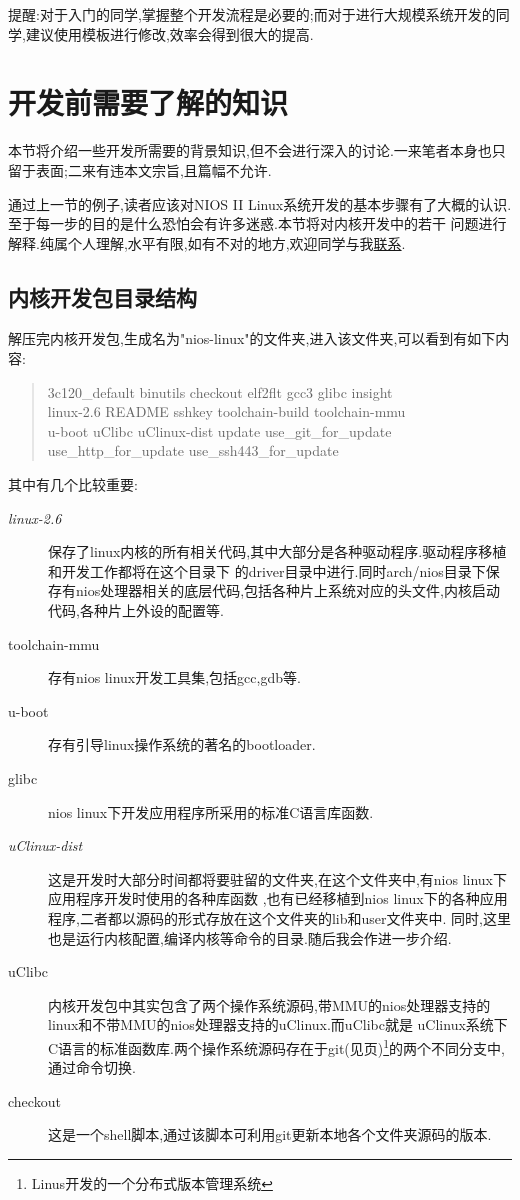 \documentclass[12pt,a4paper,titlepage]{article}
\begin{document}
提醒:对于入门的同学,掌握整个开发流程是必要的;而对于进行大规模系统开发的同学,建议使用模板进行修改,效率会得到很大的提高.
\newpage{}
\section{开发前需要了解的知识}
\setcounter{footnote}{0}
本节将介绍一些开发所需要的背景知识,但不会进行深入的讨论.一来笔者本身也只留于表面;二来有违本文宗旨,且篇幅不允许.

通过上一节的例子,读者应该对NIOS II Linux系统开发的基本步骤有了大概的认识.至于每一步的目的是什么恐怕会有许多迷惑.本节将对内核开发中的若干
问题进行解释.纯属个人理解,水平有限,如有不对的地方,欢迎同学与我\href{mailto:cfistalent@gmail.com}{联系}.
\subsection{内核开发包目录结构}
解压完内核开发包,生成名为"nios-linux"的文件夹,进入该文件夹,可以看到有如下内容:
\begin{quote}
3c120\_default binutils checkout elf2flt gcc3 glibc insight\\
linux-2.6 README sshkey toolchain-build toolchain-mmu\\
u-boot uClibc uClinux-dist update use\_git\_for\_update\\
use\_http\_for\_update use\_ssh443\_for\_update
\end{quote}
其中有几个比较重要:
\begin{description}
\item[\textit{linux-2.6}] 保存了linux内核的所有相关代码,其中大部分是各种驱动程序.驱动程序移植和开发工作都将在这个目录下
的driver目录中进行.同时arch/nios目录下保存有nios处理器相关的底层代码,包括各种片上系统对应的头文件,内核启动代码,各种片上外设的配置等.
\item[toolchain-mmu] 存有nios linux开发工具集,包括gcc,gdb等.
\item[u-boot] 存有引导linux操作系统的著名的bootloader.
\item[glibc] nios linux下开发应用程序所采用的标准C语言库函数.
\item[\textit{uClinux-dist}] 这是开发时大部分时间都将要驻留的文件夹,在这个文件夹中,有nios linux下应用程序开发时使用的各种库函数
,也有已经移植到nios linux下的各种应用程序,二者都以源码的形式存放在这个文件夹的lib和user文件夹中.
同时,这里也是运行内核配置,编译内核等命令的目录.随后我会作进一步介绍.
\item[uClibc] 内核开发包中其实包含了两个操作系统源码,带MMU的nios处理器支持的linux和不带MMU的nios处理器支持的uClinux.而uClibc就是
uClinux系统下C语言的标准函数库.两个操作系统源码存在于git(见\pageref{git}页)\footnote{Linus开发的一个分布式版本管理系统}的两个不同分支中,
通过命令切换.
\item[checkout] 这是一个shell脚本,通过该脚本可利用git更新本地各个文件夹源码的版本.
\end{description}
\end{document}
